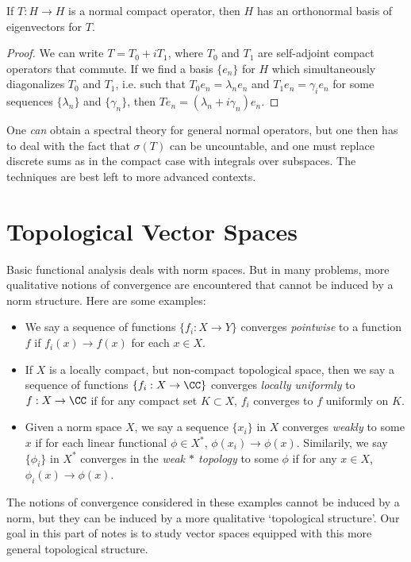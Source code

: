 \begin{corollary}
    If $T: H \to H$ is a normal compact operator, then $H$ has an orthonormal basis of eigenvectors for $T$.
\end{corollary}
\begin{proof}
    We can write $T = T_0 + i T_1$, where $T_0$ and $T_1$ are self-adjoint compact operators that commute. If we find a basis $\{ e_n \}$ for $H$ which simultaneously diagonalizes $T_0$ and $T_1$, i.e. such that $T_0e_n = \lambda_n e_n$ and $T_1 e_n= \gamma_i e_n$ for some sequences $\{ \lambda_n \}$ and $\{ \gamma_n \}$, then $Te_n = (\lambda_n + i \gamma_n) e_n$.
\end{proof}

\begin{remark}
    One \emph{can} obtain a spectral theory for general normal operators, but one then has to deal with the fact that $\sigma(T)$ can be uncountable, and one must replace discrete sums as in the compact case with integrals over subspaces. The techniques are best left to more advanced contexts.
\end{remark}






















\chapter{Topological Vector Spaces}

Basic functional analysis deals with norm spaces. But in many problems, more qualitative notions of convergence are encountered that cannot be induced by a norm structure. Here are some examples:
%
\begin{itemize}
    \item We say a sequence of functions $\{ f_i: X \to Y \}$ converges \emph{pointwise} to a function $f$ if $f_i(x) \to f(x)$ for each $x \in X$.

    \item If $X$ is a locally compact, but non-compact topological space, then we say a sequence of functions $\{ f_i: X \to \CC \}$ converges \emph{locally uniformly} to $f: X \to \CC$ if for any compact set $K \subset X$, $f_i$ converges to $f$ uniformly on $K$.

    \item Given a norm space $X$, we say a sequence $\{ x_i \}$ in $X$ converges \emph{weakly} to some $x$ if for each linear functional $\phi \in X^*$, $\phi(x_i) \to \phi(x)$. Similarily, we say $\{ \phi_i \}$ in $X^*$ converges in the \emph{weak $*$ topology} to some $\phi$ if for any $x \in X$, $\phi_i(x) \to \phi(x)$.
\end{itemize}
%
The notions of convergence considered in these examples cannot be induced by a norm, but they can be induced by a more qualitative `topological structure'. Our goal in this part of notes is to study vector spaces equipped with this more general topological structure.

